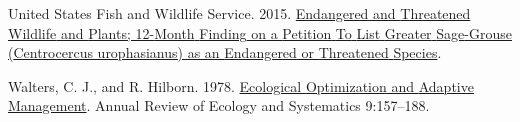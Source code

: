 \documentclass[
  12pt,
]{article}
\newlength{\cslhangindent}
\newlength{\cslentryspacingunit} %
\newenvironment{CSLReferences}[2] %
 {%
  \setlength{\parindent}{0pt}
  \ifodd #1
  \let\oldpar\par
  \def\par{\hangindent=\cslhangindent\oldpar}
  \fi
  \setlength{\parskip}{#2\cslentryspacingunit}
 }%
 {}
\begin{document}
\begin{CSLReferences}{1}{0}
\leavevmode{}%
United States Fish and Wildlife Service. 2015. \href{https://www.federalregister.gov/documents/2015/10/02/2015-24292/endangered-and-threatened-wildlife-and-plants-12-month-finding-on-a-petition-to-list-greater}{Endangered and {Threatened} {Wildlife} and {Plants}; 12-{Month} {Finding} on a {Petition} {To} {List} {Greater} {Sage}-{Grouse} ({Centrocercus} urophasianus) as an {Endangered} or {Threatened} {Species}}.

\leavevmode{}%
Walters, C. J., and R. Hilborn. 1978. \href{https://doi.org/10.1146/annurev.es.09.110178.001105}{Ecological {Optimization} and {Adaptive} {Management}}. Annual Review of Ecology and Systematics 9:157--188.

\end{CSLReferences}
\end{document}
